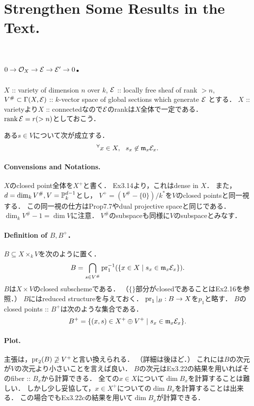 \documentclass[a4paper]{jsarticle}
\begin{document}
\section{Strengthen Some Results in the Text.} %

\section{$0 \to \mathcal{O}_X \to \mathcal{E} \to \mathcal{E}' \to 0$.} %
    $X$ :: variety of dimension $n$ over $k$,
    $\mathcal{E}$ :: locally free sheaf of rank $>n$,
    $V^{\#} \subset \Gamma(X,\mathcal{E})$ ::
    $k$-vector space of global sections which generate $\mathcal{E}$
    とする．
    $X$ :: varietyより$X$ :: connectedなので$\mathcal{E}$のrankは$X$全体で一定である．
    $\operatorname{rank} \mathcal{E}=r (>n)$としておこう．

    \begin{Claim}
        ある$s \in V$について次が成立する．
        \[ {}^{\forall} x \in X,~~ s_x \not \in \mathfrak{m}_x \mathcal{E}_x. \]
    \end{Claim}

    \paragraph{Convensions and Notations.}
    $X$のclosed point全体を$X^+$と書く．
    Ex3.14より，これはdense in $X$．
    また，$d=\dim_k V^{\#}, V=\mathbb{P}_k^{d-1}$とし，
    $V^+=(V^{\#}-\{0\})/k^*$を$V$のclosed pointsと同一視する．
    この同一視の仕方はProp7.7やdual projective spaceと同じである．
    $\dim_k V^{\#}-1=\dim V$に注意．
    $V^{\#}$のsubspaceも同様に$V$のsubspaceとみなす．

    \paragraph{Definition of $B, B^+$．}
    $B \subseteq X \times_k V$を次のように置く．
    \[ B=\bigcap_{s \in V^{\#}} \operatorname{pr}_1^{-1}(\{ x \in X \mid s_x \in \mathfrak{m}_x\mathcal{E}_x \}). \]
    $B$は$X \times V$のclosed subschemeである．
    （$\{\}$部分がclosedであることはEx2.16を参照．）
    $B$にはreduced structureを与えておく．
    $\operatorname{pr}_1|_{B}: B \to X$を$p_1$と略す．
    $B$のclosed points :: $B^+$は次のような集合である．
    \[ B^+=\{ (x, s) \in X^+ \oplus V^+ \mid s_x \in \mathfrak{m}_x\mathcal{E}_x \}. \]

    \paragraph{Plot.}
    主張は，$\operatorname{pr}_2(B) \not \supseteq V^+$と言い換えられる．
    （詳細は後ほど．）
    これには$B$の次元が$V$の次元より小さいことを言えば良い．
    $B$の次元はEx3.22の結果を用いればそのfiber :: $B_x$から計算できる．
    全ての$x \in X$について$\dim B_x$を計算することは難しい．
    しかし少し妥協して，$x \in X^+$についての$\dim B_x$を計算することは出来る．
    この場合でもEx3.22cの結果を用いて$\dim B_x$が計算できる．
\end{document}
